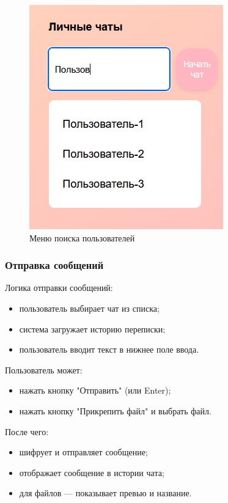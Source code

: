 \begin{figure}[!h]
	\centering
	\includegraphics[width=0.7\linewidth]{"images/Меню поиска пользователей"}
	\caption{Меню поиска пользователей}
	\label{fig:search-users}
\end{figure}

\subsubsection{Отправка сообщений}  
Логика отправки сообщений:  
\begin{itemize}  
	\item пользователь выбирает чат из списка;  
	\item система загружает историю переписки;  
	\item пользователь вводит текст в нижнее поле ввода.
\end{itemize}

Пользователь может:

\begin{itemize}
		\item нажать кнопку "Отправить" (или Enter);  
		\item нажать кнопку "Прикрепить файл" и выбрать файл.
\end{itemize}

После чего:

\begin{itemize}
		\item шифрует и отправляет сообщение;  
		\item отображает сообщение в истории чата;  
		\item для файлов — показывает превью и название.   
\end{itemize}

